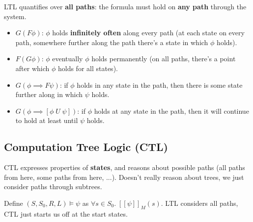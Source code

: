 \documentclass[a4paper, 11pt]{article}
\newcommand{\interp}[2][]{\mathcal{#1}[\![#2]\!]}
\begin{document}
{{        LTL quantifies over \textbf{all paths}: the formula must hold on \textbf{any path} through the system.

        \begin{itemize}
        \item \(G(F\phi)\): \(\phi\) holds \textbf{infinitely often} along every path (at each state on every path, somewhere further along the path there's a state in which \(\phi\) holds).
        \item \(F(G\phi)\): \(\phi\) eventually \(\phi\) holds permanently (on all paths, there's a point after which \(\phi\) holds for all states).
        \item \(G(\phi \implies F\psi)\): if \(\phi\) holds in any state in the path, then there is some state further along in which \(\psi\) holds.
        \item \(G(\phi \implies [\phi\;U\;\psi])\): if \(\phi\) holds at any state in the path, then it will continue to hold at least until \(\psi\) holds.
        \end{itemize}
    }
    \subsection*{Computation Tree Logic (CTL)}
    {
        CTL expresses properties of \textbf{states}, and reasons about possible paths (all paths from here, some paths from here, ...). Doesn't really reason about trees, we just consider paths through subtrees.

        Define \((S,S_0,R,L)\vDash\psi\) as \(\forall s\in S_0.\;\interp{\psi}_M(s)\). LTL considers all paths, CTL just starts us off at the start states.

}}
\end{document}
